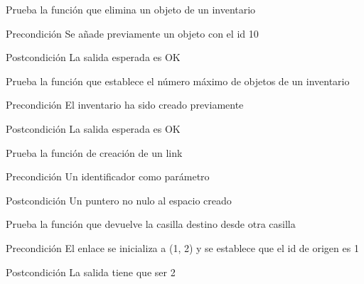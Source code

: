 \begin{DoxyRefList}
\item[\label{test__test000123}%
\hypertarget{test__test000123}{}%
Global \hyperlink{inventory__test_8c_a2600ada0b5b2e5a34dfe6bc368f5e3be}{test1\-\_\-inventory\-\_\-remove\-\_\-object} ()]Prueba la función que elimina un objeto de un inventario \begin{DoxyPrecond}{Precondición}
Se añade previamente un objeto con el id 10 
\end{DoxyPrecond}
\begin{DoxyPostcond}{Postcondición}
La salida esperada es O\-K  
\end{DoxyPostcond}

\item[\label{test__test000118}%
\hypertarget{test__test000118}{}%
Global \hyperlink{inventory__test_8c_a54de162acad19de88c02e72f9db5cc27}{test1\-\_\-inventory\-\_\-set\-\_\-max} ()]Prueba la función que establece el número máximo de objetos de un inventario \begin{DoxyPrecond}{Precondición}
El inventario ha sido creado previamente 
\end{DoxyPrecond}
\begin{DoxyPostcond}{Postcondición}
La salida esperada es O\-K  
\end{DoxyPostcond}

\item[\label{test__test000128}%
\hypertarget{test__test000128}{}%
Global \hyperlink{link__test_8c_a82c5ee441ad22caad8272212a9e9cc26}{test1\-\_\-link\-\_\-create} ()]Prueba la función de creación de un link \begin{DoxyPrecond}{Precondición}
Un identificador como parámetro 
\end{DoxyPrecond}
\begin{DoxyPostcond}{Postcondición}
Un puntero no nulo al espacio creado  
\end{DoxyPostcond}

\item[\label{test__test000154}%
\hypertarget{test__test000154}{}%
Global \hyperlink{link__test_8c_ac7f5617225337ee2d76fb8969be5ff54}{test1\-\_\-link\-\_\-get\-\_\-dest\-\_\-from} ()]Prueba la función que devuelve la casilla destino desde otra casilla \begin{DoxyPrecond}{Precondición}
El enlace se inicializa a (1, 2) y se establece que el id de origen es 1 
\end{DoxyPrecond}
\begin{DoxyPostcond}{Postcondición}
La salida tiene que ser 2  
\end{DoxyPostcond}


\end{DoxyRefList}
